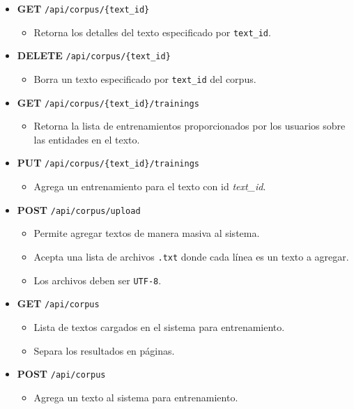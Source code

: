 \documentclass[12pt,a4paper,]{scrartcl}
\providecommand{\tightlist}{%
  \setlength{\itemsep}{0pt}\setlength{\parskip}{0pt}}
\begin{document}
\begin{itemize}
\tightlist
\item
  \textbf{GET} \texttt{/api/corpus/\{text\_id\}}

  \begin{itemize}
  \tightlist
  \item
    Retorna los detalles del texto especificado por \texttt{text\_id}.
  \end{itemize}
\item
  \textbf{DELETE} \texttt{/api/corpus/\{text\_id\}}

  \begin{itemize}
  \tightlist
  \item
    Borra un texto especificado por \texttt{text\_id} del corpus.
  \end{itemize}
\item
  \textbf{GET} \texttt{/api/corpus/\{text\_id\}/trainings}

  \begin{itemize}
  \tightlist
  \item
    Retorna la lista de entrenamientos proporcionados por los usuarios sobre las entidades en el texto.
  \end{itemize}
\item
  \textbf{PUT} \texttt{/api/corpus/\{text\_id\}/trainings}

  \begin{itemize}
  \tightlist
  \item
    Agrega un entrenamiento para el texto con id \emph{text\_id}.
  \end{itemize}
\item
  \textbf{POST} \texttt{/api/corpus/upload}

  \begin{itemize}
  \tightlist
  \item
    Permite agregar textos de manera masiva al sistema.
  \item
    Acepta una lista de archivos \texttt{.txt} donde cada línea es un texto a agregar.
  \item
    Los archivos deben ser \texttt{UTF-8}.
  \end{itemize}
\item
  \textbf{GET} \texttt{/api/corpus}

  \begin{itemize}
  \tightlist
  \item
    Lista de textos cargados en el sistema para entrenamiento.
  \item
    Separa los resultados en páginas.
  \end{itemize}
\item
  \textbf{POST} \texttt{/api/corpus}

  \begin{itemize}
  \tightlist
  \item
    Agrega un texto al sistema para entrenamiento.
  \end{itemize}
\end{itemize}
\end{document}
